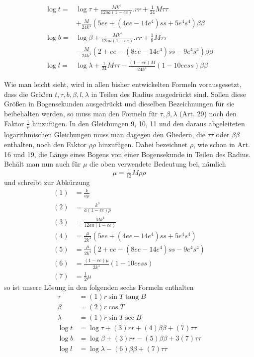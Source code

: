 %
\[
\begin{aligned}
\log t={}&\log\tau+\frac{Mk^4}{12aa(1-ee)}\mathord{.}rr+\tfrac1{24}M\tau\tau\\
&+\frac M{24k^4}(5ee+(4ee-14e^4)ss+5e^4s^4)\beta\beta\\
\log b={}&\log\beta+\frac{Mk^4}{12aa(1-ee)}\mathord{.}rr+\tfrac18M\tau\tau\\
&-\frac M{24k^4}(2+ee-(8ee-14e^4)ss-9e^4s^4)\beta\beta\\
\log l={}&\log\lambda+\tfrac1{24}M\tau\tau-\frac{(1-ee)M}{24k^4}(1-10eess)\beta\beta
\end{aligned}
\]

Wie man leicht sieht, wird in allen bisher entwickelten Formeln vorausgesetzt, dass die Größen \(t,\tau,b,\beta,l,\lambda\) in Teilen des Radius ausgedrückt sind. Sollen diese Größen in Bogensekunden ausgedrückt und dieselben Bezeichnungen für sie beibehalten werden, so muss man den Formeln für \(\tau,\beta,\lambda\) (Art. 29) noch den Faktor \(\frac1\rho\) hinzufügen. In den Gleichungen 9, 10, 11 und den daraus abgeleiteten logarithmischen Gleichungen muss man dagegen den Gliedern, die \(\tau\tau\) oder \(\beta\beta\) enthalten, noch den Faktor \(\rho\rho\) hinzufügen. Dabei bezeichnet \(\rho\), wie schon in Art. 16 und 19, die Länge eines Bogens von einer Bogensekunde in Teilen des Radius. Behält man nun auch für \(\mu\) die oben verwendete Bedeutung bei, nämlich
\[
\mu=\tfrac1{12}M\rho\rho
\]
und schreibt zur Abkürzung
\[
\begin{aligned}
(1)&=\frac{k}{a\rho}\\
(2)&=\frac{k^3}{a(1-ee)\rho}\\
(3)&=\frac{Mk^4}{12aa(1-ee)}\\
(4)&=\frac{\mu}{2k^4}(5ee+(4ee-14e^4)ss+5e^4s^4)\\
(5)&=\frac{\mu}{2k^4}(2+ee-(8ee-14e^4)ss-9e^4s^4)\\
(6)&=\frac{(1-ee)\mu}{2k^4}(1-10eess)\\
(7)&=\tfrac12\mu
\end{aligned}
\]
so ist unsere Lösung in den folgenden sechs Formeln enthalten
\[
\begin{aligned}
\tau&=(1)r\sin T\operatorname{tang}B\\
\beta&=(2)r\cos T\\
\lambda&=(1)r\sin T\sec B\\
\log t&=\log\tau+(3)rr+(4)\beta\beta+(7)\tau\tau\\
\log b&=\log\beta+(3)rr-(5)\beta\beta+3(7)\tau\tau\\
\log l&=\log\lambda-(6)\beta\beta+(7)\tau\tau
\end{aligned}
\]
